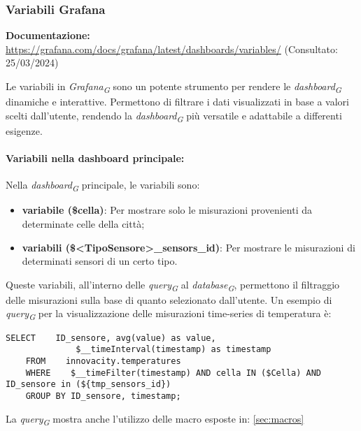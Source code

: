 \subsubsection{Variabili Grafana}
\textbf{Documentazione:}
\url{https://grafana.com/docs/grafana/latest/dashboards/variables/} (Consultato: 25/03/2024)


Le variabili in \textit{Grafana}\textsubscript{\textit{G}} sono un potente strumento per rendere le \textit{dashboard}\textsubscript{\textit{G}} dinamiche e interattive. Permettono di filtrare i dati visualizzati in base a valori scelti dall'utente, rendendo la \textit{dashboard}\textsubscript{\textit{G}} più versatile e adattabile a differenti esigenze.
\paragraph*{Variabili nella dashboard principale:}
Nella \textit{dashboard}\textsubscript{\textit{G}} principale, le variabili sono:
\begin{itemize}
    \item \textbf{variabile (\$cella)}: Per mostrare solo le misurazioni provenienti da determinate celle della città;
    \item \textbf{variabili (\$<TipoSensore>\_sensors\_id)}: Per mostrare le misurazioni di determinati sensori di un certo tipo.
\end{itemize}
Queste variabili, all'interno delle \textit{query}\textsubscript{\textit{G}} al \textit{database}\textsubscript{\textit{G}}, permettono il filtraggio delle misurazioni sulla base di quanto selezionato dall'utente.
Un esempio di \textit{query}\textsubscript{\textit{G}} per la visualizzazione delle misurazioni time-series di temperatura è:
\begin{lstlisting}[style=code]
    SELECT    ID_sensore, avg(value) as value,
              $__timeInterval(timestamp) as timestamp
    FROM    innovacity.temperatures 
    WHERE    $__timeFilter(timestamp) AND cella IN ($Cella) AND ID_sensore in (${tmp_sensors_id})
    GROUP BY ID_sensore, timestamp;
\end{lstlisting}

La \textit{query}\textsubscript{\textit{G}} mostra anche l'utilizzo delle macro esposte in: \ref{sec:macros}

